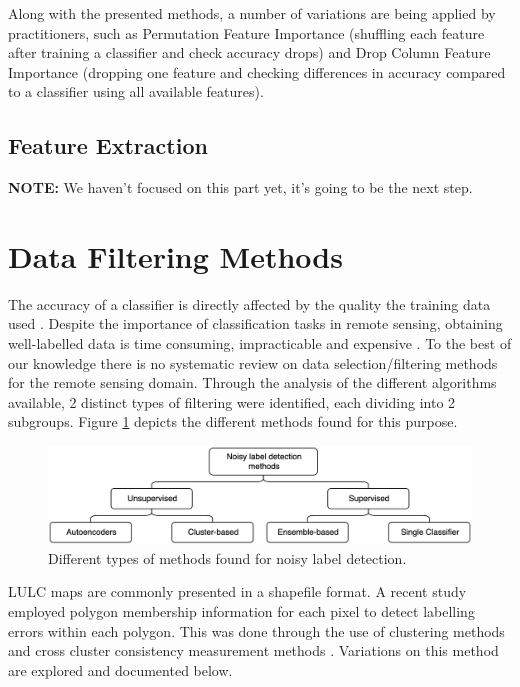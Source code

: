 \documentclass[12pt, english, openany]{book}
\begin{document}
Along with the presented methods, a number of variations are being applied by
practitioners, such as Permutation Feature Importance (shuffling each feature
after training a classifier and check accuracy drops) and Drop Column Feature
Importance (dropping one feature and checking differences in accuracy compared
to a classifier using all available features).


\subsection*{Feature Extraction}

\textbf{NOTE:} We haven't focused on this part yet, it's going to be the next
step.

\section{Data Filtering Methods}

The accuracy of a classifier is directly affected by the quality the training
data used \cite{Boukir2019}. Despite the importance of classification tasks in
remote sensing, obtaining well-labelled data is time consuming, impracticable
and expensive \cite{Pelletier2017Filtering}. To the best of our knowledge there
is no systematic review on data selection/filtering methods for the remote
sensing domain. Through the analysis of the different algorithms available, 2
distinct types of filtering were identified, each dividing into 2 subgroups.
Figure \ref{fig:noisy-label-detection} depicts the different methods found for
this purpose.

\begin{figure}[H]
	\centering
	\includegraphics[width=1\linewidth]{noisy_label_detection.png}
  \caption{Different types of methods found for noisy label detection.}
  \label{fig:noisy-label-detection}
\end{figure}

LULC maps are commonly presented in a shapefile format. A recent study
employed polygon membership information for each pixel to detect labelling
errors within each polygon. This was done through the use of clustering methods
and cross cluster consistency measurement methods \cite{Paris2019}. Variations
on this method are explored and documented below.
\end{document}
